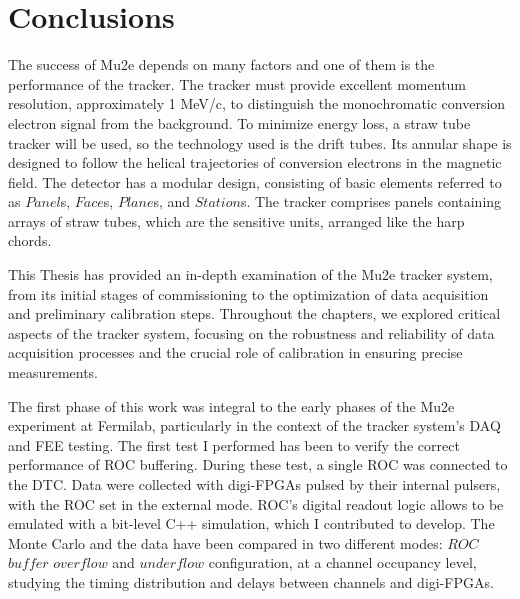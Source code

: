 \chapter{Conclusions}\label{conclusions}
The success of Mu2e depends on many factors and one of them is the 
performance of the tracker. 
The tracker must provide excellent momentum resolution, approximately 1 MeV/c, 
to distinguish the monochromatic conversion electron signal from the background. 
To minimize energy loss, a straw tube tracker will be used, so the 
technology used is the drift tubes. Its 
annular shape is designed to follow the helical trajectories of conversion 
electrons in the magnetic field. The detector has a modular design, consisting 
of basic elements referred to as $Panel$s, $Face$s, $Plane$s, and $Station$s. The 
tracker comprises panels containing arrays of straw tubes, which are the 
sensitive units, arranged like the harp chords.

This Thesis has provided an in-depth examination of the Mu2e 
tracker system, from its initial stages of commissioning to the 
optimization of data acquisition and preliminary calibration steps. 
Throughout the chapters, we explored critical aspects of the tracker 
system, focusing on the robustness and reliability of data acquisition 
processes and the crucial role of calibration in ensuring precise measurements. 

The first phase of this work was integral to the early phases of the Mu2e experiment 
at Fermilab, particularly in the context of the 
tracker system's DAQ and FEE testing. 
The first test I performed has been to verify the correct performance of ROC 
buffering. During these test, a single ROC was connected to the DTC. Data were collected
with digi-FPGAs pulsed by their internal pulsers, with the ROC set in the external
mode. ROC's digital readout logic allows to be emulated with a bit-level C++ simulation,
which I contributed to develop. The Monte Carlo and the data have been compared in two different 
modes: $ROC$ $buffer$ $overflow$ and $underflow$ configuration, at a channel occupancy level, studying 
the timing distribution and delays between channels and digi-FPGAs.